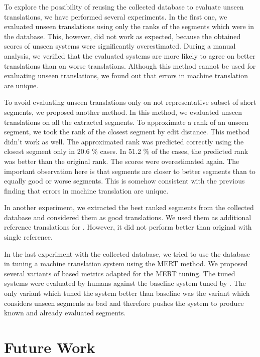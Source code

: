 To explore the possibility of reusing the collected database to evaluate unseen
translations, we have performed several experiments. In the first one, we
evaluated unseen translations using only the ranks of the segments which were
in the database.  This, however, did not work as expected, because the obtained
scores of unseen systems were significantly overestimated. During a manual
analysis, we verified that the evaluated systems are more likely to agree on
better translations than on worse translations. Although this method cannot be
used for evaluating unseen translations, we found out that errors in machine
translation are unique.

To avoid evaluating unseen translations only on not representative subset of
short segments, we proposed another method. In this method, we evaluated unseen
translations on all the extracted segments. To approximate a rank of an unseen
segment, we took the rank of the closest segment by edit distance. This method
didn't work as well.  The approximated rank was predicted correctly using the
closest segment only in 20.6 \% cases.  In 51.2 \% of the cases, the predicted
rank was better than the original rank. The scores were overestimated again.
The important observation here is that segments are closer to better segments
than to equally good or worse segments. This is somehow consistent with the
previous finding that errors in machine translation are unique.

In another experiment, we extracted the best ranked segments from the collected
database and considered them as good translations. We used them as additional
reference translations for . However, it did not perform better
than original  with single reference. 

In the last experiment with the collected database, we tried to use the
database in tuning a machine translation system using the MERT method.  We
proposed several variants of  based metrics adapted for the
MERT tuning. The tuned systems were evaluated by humans against the baseline
system tuned by . The only variant which tuned the system better
than baseline was the variant which considers unseen segments as bad and
therefore pushes the system to produce known and already evaluated segments.


\section{Future Work}
